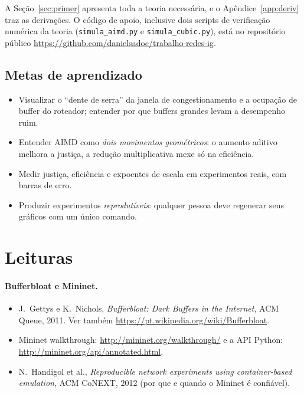 \documentclass[11pt,a4paper]{article}
\begin{document}
A Seção~\ref{sec:primer} apresenta toda a teoria necessária, e o
Apêndice~\ref{app:deriv} traz as derivações. O código de apoio, inclusive dois scripts
de verificação numérica da teoria (\texttt{simula\_aimd.py} e \texttt{simula\_cubic.py}),
está no repositório público \url{https://github.com/danielsadoc/trabalho-redes-ig}.

\subsection*{Metas de aprendizado}
\begin{itemize}
\item Visualizar o “dente de serra” da janela de congestionamento e a ocupação de
buffer do roteador; entender por que buffers grandes levam a desempenho ruim.
\item Entender AIMD como \emph{dois movimentos geométricos}: o aumento aditivo melhora
a justiça, a redução multiplicativa mexe só na eficiência.
\item Medir justiça, eficiência e expoentes de escala em experimentos reais, com
barras de erro.
\item Produzir experimentos \emph{reprodutíveis}: qualquer pessoa deve regenerar seus
gráficos com um único comando.
\end{itemize}

\section{Leituras}
\label{sec:leituras}

\paragraph{Bufferbloat e Mininet.}
\begin{itemize}
\item J.~Gettys e K.~Nichols, \emph{Bufferbloat: Dark Buffers in the Internet}, ACM
Queue, 2011. Ver também \url{https://pt.wikipedia.org/wiki/Bufferbloat}.
\item Mininet walkthrough: \url{http://mininet.org/walkthrough/} e a API Python:
\url{http://mininet.org/api/annotated.html}.
\item N.~Handigol et al., \emph{Reproducible network experiments using
container-based emulation}, ACM CoNEXT, 2012 (por que e quando o Mininet é confiável).
\end{itemize}
\end{document}
